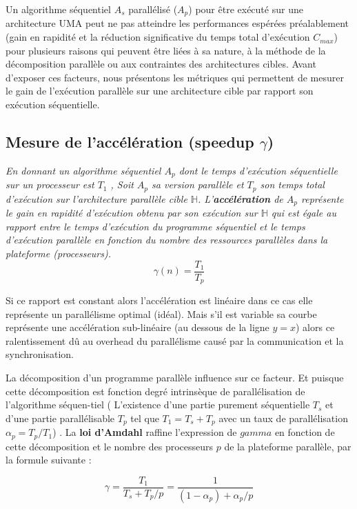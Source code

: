 Un algorithme séquentiel $A_s$ parallélisé ($A_p$) pour être exécuté sur une architecture UMA peut ne pas atteindre les performances espérées préalablement (gain en rapidité et la réduction significative du temps total d'exécution $C_{max}$) pour plusieurs raisons qui peuvent être liées à 
 sa nature, 
à la méthode de la décomposition parallèle ou 
aux contraintes des architectures cibles. 
Avant d'exposer ces facteurs, nous présentons les métriques qui permettent de mesurer le gain de l'exécution parallèle sur une architecture cible par rapport son exécution séquentielle.
%
\subsection{Mesure de l'accélération (speedup $\gamma$)} 
%
\begin{définition}\textit{
%
En donnant un algorithme séquentiel $A_p$ dont le temps d'exécution séquentielle sur un processeur est $T_1$ , 
Soit $A_p$ sa version parallèle et $T_p$ son temps total d'exécution sur l'architecture parallèle cible $\mathbb{H}$.
L’\textbf{accélération} de $A_p$ représente le gain en rapidité d’exécution obtenu par son exécution sur $\mathbb{H}$ qui est égale au rapport entre le temps d’exécution du programme séquentiel et le temps d’exécution parallèle en fonction du nombre des ressources parallèles dans la plateforme (processeurs).
$$\gamma(n) = \frac{T_1}{T_p}$$
}\end{définition}
%
Si ce rapport est constant alors l’accélération est linéaire dans ce cas elle représente un parallélisme optimal (idéal). 
Mais s’il est variable sa courbe représente une accélération sub-linéaire (au dessous de la ligne $y=x$) alors ce ralentissement dû au overhead du parallélisme causé par la communication et la synchronisation.

La décomposition d’un programme parallèle influence sur ce facteur. Et puisque cette décomposition est fonction degré intrinsèque de parallélisation de l'algorithme séquen-tiel (
L’existence d'une partie purement séquentielle $T_s$ et d'une partie parallélisable $T_p$ tel que $T_1 = T_s + T_p$ avec un taux de parallélisation $\alpha_p = T_p/T_1$) . 
La \textbf{loi d'Amdahl} raffine l'expression de $gamma$ en fonction de cette décomposition et le nombre des processeurs $p$ de la plateforme parallèle, par la formule suivante \cite{raub13}:

$$ \gamma = \frac{T_1}{T_s + T_p/p} = \frac{1}{(1-\alpha_p) + \alpha_p/p}$$

